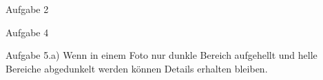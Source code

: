 \documentclass[SSS_Laborbericht.tex]{subfiles}
\begin{document}



\noindent\Large{Aufgabe 2}







\noindent\Large{Aufgabe 4}


\newpage
\noindent\Large{Aufgabe 5.a)}
\noindent\normalsize{Wenn in einem Foto nur dunkle Bereich aufgehellt und helle Bereiche abgedunkelt werden können Details erhalten bleiben.}


\end{document}
